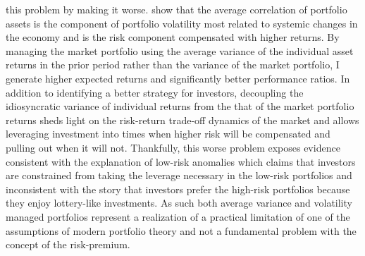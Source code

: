 this problem by making it worse. \citet{pollet_average_2010} show that the average correlation of portfolio assets is the component of portfolio volatility most related to systemic changes in the economy and is the risk component compensated with higher returns. By managing the market portfolio using the average variance of the individual asset returns in the prior period rather than the variance of the market portfolio, I generate higher expected returns and significantly better performance ratios. In addition to identifying a better strategy for investors, decoupling the idiosyncratic variance of individual returns from the that of the market portfolio returns sheds light on the risk-return trade-off dynamics of the market and allows leveraging investment into times when higher risk will be compensated and pulling out when it will not. Thankfully, this worse problem exposes evidence consistent with the explanation of low-risk anomalies which claims that investors are constrained from taking the leverage necessary in the low-risk portfolios and inconsistent with the story that investors prefer the high-risk portfolios because they enjoy lottery-like investments. As such both average variance and volatility managed portfolios represent a realization of a practical limitation of one of the assumptions of modern portfolio theory and not a fundamental problem with the concept of the risk-premium.



